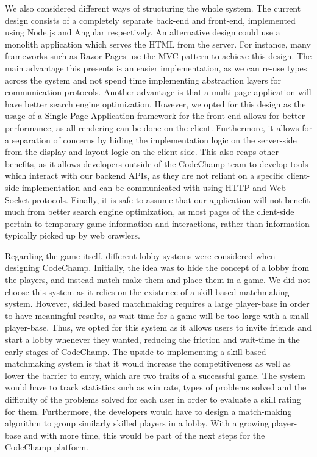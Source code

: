 \documentclass[12pt, titlepage]{article}
\begin{document}
We also considered different ways of structuring the whole system. The current design consists of a completely separate back-end and front-end, implemented using Node.js and Angular respectively. An alternative design could use a monolith application which serves the HTML from the server. For instance, many frameworks such as Razor Pages use the MVC pattern to achieve this design. The main advantage this presents is an easier implementation, as we can re-use types across the system and not spend time implementing abstraction layers for communication protocols. Another advantage is that a multi-page application will have better search engine optimization. However, we opted for this design as the usage of a Single Page Application framework for the front-end allows for better performance, as all rendering can be done on the client. Furthermore, it allows for a separation of concerns by hiding the implementation logic on the server-side from the display and layout logic on the client-side. This also reaps other benefits, as it allows developers outside of the CodeChamp team to develop tools which interact with our backend APIs, as they are not reliant on a specific client-side implementation and can be communicated with using HTTP and Web Socket protocols. Finally, it is safe to assume that our application will not benefit much from better search engine optimization, as most pages of the client-side pertain to temporary game information and interactions, rather than information typically picked up by web crawlers.

Regarding the game itself, different lobby systems were considered when designing CodeChamp. Initially, the idea was to hide the concept of a lobby from the players, and instead match-make them and place them in a game. We did not choose this system as it relies on the existence of a skill-based matchmaking system. However, skilled based matchmaking requires a large player-base in order to have meaningful results, as wait time for a game will be too large with a small player-base. Thus, we opted for this system as it allows users to invite friends and start a lobby whenever they wanted, reducing the friction and wait-time in the early stages of CodeChamp.  The upside to implementing a skill based matchmaking system is that it would increase the competitiveness as well as lower the barrier to entry, which are two traits of a successful game. The system would have to track statistics such as win rate, types of problems solved and the difficulty of the problems solved for each user in order to evaluate a skill rating for them. Furthermore, the developers would have to design a match-making algorithm to group similarly skilled players in a lobby. With a growing player-base and with more time, this would be part of the next steps for the CodeChamp platform.
\end{document}

